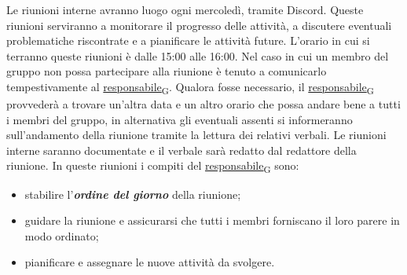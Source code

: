 Le riunioni interne avranno luogo ogni mercoledì, tramite Discord. Queste riunioni serviranno a monitorare il progresso delle attività, a discutere eventuali problematiche riscontrate e a pianificare le attività future. L'orario in cui si terranno queste riunioni è dalle 15:00 alle 16:00. Nel caso in cui un membro del gruppo non possa partecipare alla riunione è tenuto a comunicarlo tempestivamente al \href{https://7last.github.io/docs/pb/documentazione-interna/glossario\#responsabile}{responsabile\textsubscript{G}}. Qualora fosse necessario, il \href{https://7last.github.io/docs/pb/documentazione-interna/glossario\#responsabile}{responsabile\textsubscript{G}} provvederà a trovare un'altra data e un altro orario che possa andare bene a tutti i membri del gruppo, in alternativa gli eventuali assenti si informeranno sull'andamento della riunione tramite la lettura dei relativi verbali.
 Le riunioni interne saranno documentate e il verbale sarà redatto dal redattore della riunione. In queste riunioni i compiti del \href{https://7last.github.io/docs/pb/documentazione-interna/glossario\#responsabile}{responsabile\textsubscript{G}} sono:
\begin{itemize}
    \item stabilire l'\textbf{\textit{ordine del giorno}} della riunione;
    \item guidare la riunione e assicurarsi che tutti i membri forniscano il loro parere in modo ordinato;
    \item pianificare e assegnare le nuove attività da svolgere.
\end{itemize}

